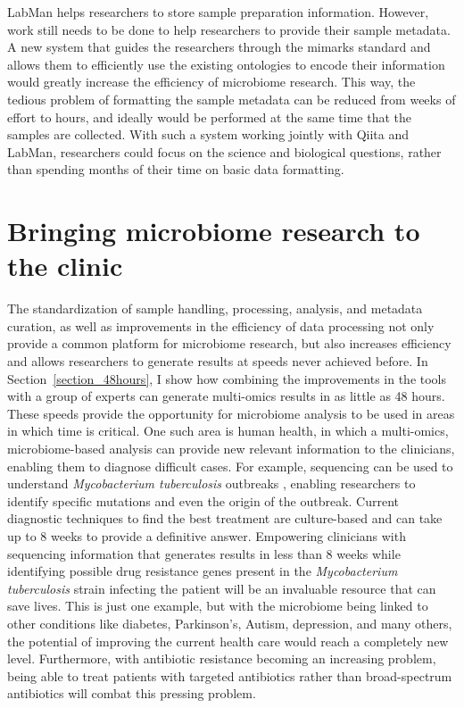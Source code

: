 LabMan helps researchers to store sample preparation information. However,
work still needs to be done to help researchers to provide their sample metadata.
A new system that guides the researchers through the \gls{mimarks} standard and
allows them to efficiently use the existing ontologies to encode their
information would greatly increase the efficiency of microbiome research.
This way, the tedious problem of formatting the sample metadata can be reduced
from weeks of effort to hours, and ideally would be performed at the same time
that the samples are collected. With such a system working jointly with Qiita and
LabMan, researchers could focus on the science and biological questions,
rather than spending months of their time on basic data formatting.

\section{Bringing microbiome research to the clinic}

The standardization of sample handling, processing, analysis, and metadata curation,
as well as improvements in the efficiency of data processing not only provide a
common platform for microbiome research, but also increases efficiency and allows
researchers to generate results at speeds never achieved before. In Section~\ref{section_48hours},
I show how combining the improvements in the tools with a group of experts can
generate multi-omics results in as little as 48 hours. These speeds provide the
opportunity for microbiome analysis to be used in areas in which time is critical.
One such area is human health, in which a multi-omics, microbiome-based analysis
can provide new relevant information to the clinicians, enabling them to diagnose
difficult cases. For example, sequencing can be used to understand \emph{Mycobacterium tuberculosis}
outbreaks \cite{Guthrie2017}, enabling researchers to identify specific mutations
and even the origin of the outbreak. Current diagnostic techniques to find the
best treatment are culture-based and can take up to 8 weeks to provide a definitive
answer. Empowering clinicians with sequencing information that generates results in
less than 8 weeks while identifying possible drug resistance genes present in the
\emph{Mycobacterium tuberculosis} strain infecting the patient will be an invaluable
resource that can save lives. This is just one example, but with the microbiome
being linked to other conditions like diabetes, Parkinson's, Autism, depression,
and many others, the potential of improving the current health care would reach a completely
new level. Furthermore, with antibiotic resistance becoming an increasing problem,
being able to treat patients with targeted antibiotics rather than broad-spectrum antibiotics
will combat this pressing problem.

